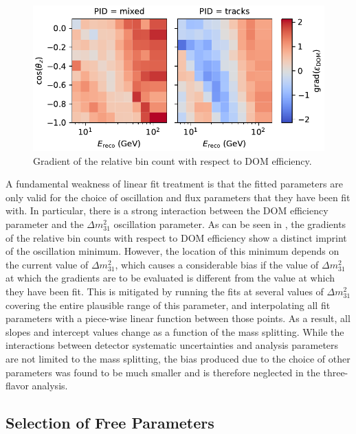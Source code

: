 \begin{figure}
    \centering
    \includegraphics[width=0.9\linewidth]{figures/measurement/systematics/detector/hs_grad_dom_eff.pdf}
    \caption{Gradient of the relative bin count with respect to DOM efficiency.}
    \label{fig:dom-efficiency-slopes}
\end{figure}
A fundamental weakness of linear fit treatment is that the fitted parameters are only valid for the  choice of oscillation and flux parameters that they have been fit with. In particular, there is a strong interaction between the DOM efficiency parameter and the $\Delta m^2_{31}$ oscillation parameter. As can be seen in , the gradients of the relative bin counts with respect to DOM efficiency show a distinct imprint of the oscillation minimum. However, the location of this minimum depends on the current value of $\Delta m^2_{31}$, which causes a considerable bias if the value of $\Delta m^2_{31}$ at which the gradients are to be evaluated is different from the value at which they have been fit. This is mitigated by running the fits at several values of $\Delta m^2_{31}$ covering the entire plausible range of this parameter, and interpolating all fit parameters with a piece-wise linear function between those points. As a result, all slopes and intercept values change as a function of the mass splitting. While the interactions between detector systematic uncertainties and analysis parameters are not limited to the mass splitting, the bias produced due to the choice of other parameters was found to be much smaller and is therefore neglected in the three-flavor analysis. 

\subsection{Selection of Free Parameters}
\label{sec:std-osc-free-parameters}

